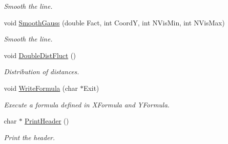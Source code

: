 \begin{DoxyCompactItemize}
\begin{DoxyCompactList}\small\item\em Smooth the line. \end{DoxyCompactList}\item 
void \hyperlink{classVarDatFile_a12fe98e58e8262bcbf3aef114673673d}{Smooth\+Gauss} (double Fact, int CoordY, int N\+Vis\+Min, int N\+Vis\+Max)\hypertarget{classVarDatFile_a12fe98e58e8262bcbf3aef114673673d}{}\label{classVarDatFile_a12fe98e58e8262bcbf3aef114673673d}

\begin{DoxyCompactList}\small\item\em Smooth the line. \end{DoxyCompactList}\item 
void \hyperlink{classVarDatFile_a6ab47ee0a227e3e13f042327b1f8fe33}{Double\+Dist\+Fluct} ()\hypertarget{classVarDatFile_a6ab47ee0a227e3e13f042327b1f8fe33}{}\label{classVarDatFile_a6ab47ee0a227e3e13f042327b1f8fe33}

\begin{DoxyCompactList}\small\item\em Distribution of distances. \end{DoxyCompactList}\item 
void \hyperlink{classVarDatFile_aedcb20a2169e38b38a21ad3f8bf011d2}{Write\+Formula} (char $\ast$Exit)\hypertarget{classVarDatFile_aedcb20a2169e38b38a21ad3f8bf011d2}{}\label{classVarDatFile_aedcb20a2169e38b38a21ad3f8bf011d2}

\begin{DoxyCompactList}\small\item\em Execute a formula defined in X\+Formula and Y\+Formula. \end{DoxyCompactList}\item 
char $\ast$ \hyperlink{classVarDatFile_ac6c6d90214b93afffeab31fd2bbe5715}{Print\+Header} ()\hypertarget{classVarDatFile_ac6c6d90214b93afffeab31fd2bbe5715}{}\label{classVarDatFile_ac6c6d90214b93afffeab31fd2bbe5715}

\begin{DoxyCompactList}\small\item\em Print the header. \end{DoxyCompactList}\end{DoxyCompactItemize}
